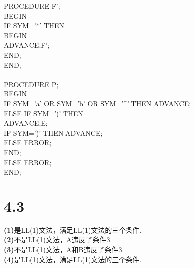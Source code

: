\documentclass{article}
\begin{document}
\begin{tabbing}
    PROCEDURE F';\\
    BEGIN\\
    \>IF SYM='*' THEN\\
    \>BEGIN\\
    \>\>ADVANCE;F';\\
    \>END;\\
    END;\\\\

    PROCEDURE P;\\
    BEGIN\\
    \>IF SYM='a' OR SYM='b' OR SYM='$\^{}$' THEN ADVANCE;\\
    \>ELSE IF SYM='(' THEN\\
    \>\>ADVANCE;E;\\
    \>\>IF SYM=')' THEN ADVANCE;\\
    \>\>ELSE ERROR;\\
    \>END;\\
    \>ELSE ERROR;\\
    END;
\end{tabbing}
\section*{4.3}
\noindent 
\textbf{(1)}是LL(1)文法，满足LL(1)文法的三个条件.\\
\textbf{(2)}不是LL(1)文法，A违反了条件3.\\
\textbf{(3)}不是LL(1)文法，A和B违反了条件3.\\
\textbf{(4)}是LL(1)文法，满足LL(1)文法的三个条件.
\end{document}
